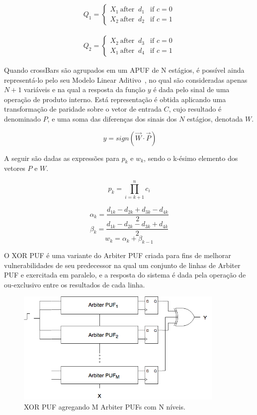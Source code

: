 \documentclass[pdftex,11pt]{article}
\begin{document}
\begin{spacing}{1.5}
\begin{eqnarray}
\label{eq:crossbar}
Q_1 = \left\{
	\begin{array}{ll}
		X_1 \ \mbox{after } \ d_1  & \mbox{if } c = 0 \\
		X_2 \ \mbox{after } \ d_2  & \mbox{if } c = 1
	\end{array}
\right.
\end{eqnarray}

\begin{eqnarray}
\label{eq:crossba2}
Q_2 = \left\{
	\begin{array}{ll}
		X_2 \ \mbox{after } \ d_3  & \mbox{if } c = 0 \\
		X_1 \ \mbox{after } \ d_4  & \mbox{if } c = 1
	\end{array}
\right.
\end{eqnarray}


Quando crossBars são agrupados em um APUF de N estágios, é possível ainda representá-lo pelo seu Modelo Linear Aditivo~\cite{ArbiterPUF-master-thesis}, no qual são consideradas apenas $N+1$ variáveis e na qual a resposta da função $y$ é dada pelo sinal de uma operação de produto interno. Está representação é obtida aplicando uma transformação de paridade sobre o vetor de entrada $C$, cujo resultado é denominado $P$, e uma soma das diferenças dos sinais dos $N$ estágios, denotada $W$.

$$\ y = sign( \vec{W} \cdot \vec{P} ) $$


A seguir são dadas as expressões para $p_k$ e $w_k$, sendo o k-ésimo elemento dos vetores $P$ e $W$.

$$ p_k = \prod_{i=k+1}^{n} c_i$$

$$ \alpha_k = \frac{d_{1k} - d_{2k} + d_{3k} - d_{4k}}{2} $$
$$ \beta_k  = \frac{d_{1k} - d_{2k} - d_{3k} + d_{4k}}{2} $$
$$ w_k = \alpha_k + \beta_{k-1} $$


O XOR PUF\cite{SuhDevadas2007} é uma variante do Arbiter PUF criada para fins de melhorar vulnerabilidades de seu predecessor na qual um conjunto de linhas de Arbiter PUF e exercitada em paralelo, e a resposta do sistema é dada pela operação de ou-exclusivo entre os resultados de cada linha.

\begin{figure}
\label{fig:xorpuf}
\centering
\includegraphics[width=10cm]{xorpuf.png}
\caption{XOR PUF agregando M Arbiter PUFs com N níveis.}
\end{figure}


\end{spacing}
\end{document}
